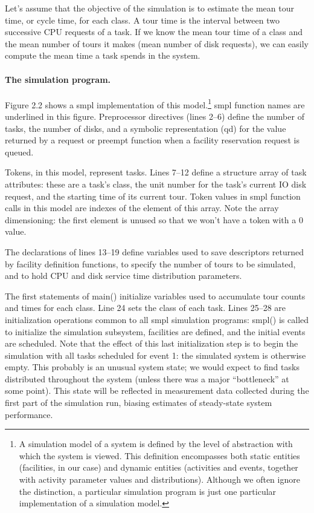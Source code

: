 Let's assume that the objective of the simulation is to estimate the mean tour
time, or cycle time, for each class. A tour time is the interval between two
successive CPU requests of a task. If we know the mean tour time of a class
and the mean number of tours it makes (mean number of disk requests), we can easily
compute the mean time a task spends in the system.

\paragraph{The simulation program.}
Figure 2.2 shows a smpl implementation of this model.\footnote{A simulation
model of a system is defined by the level of abstraction with which the system
is viewed. This definition encompasses both static entities (facilities, in our
case) and dynamic entities (activities and events, together with activity
parameter values and distributions). Although we often ignore the distinction,
a particular simulation program is just one particular implementation of a
simulation model.} smpl function names are
underlined in this figure. Preprocessor directives (lines 2--6) define the
number of tasks, the number of disks, and a symbolic representation (qd) for
the value returned by a request or preempt function when a facility
reservation request is queued.

Tokens, in this model, represent tasks. Lines 7--12 define a structure array
of task attributes: these are a task's class, the unit number for the task's
current IO disk request, and the starting time of its current tour. Token
values in smpl function calls in this model are indexes of the element of this
array. Note the array dimensioning: the first element is unused so that we
won't have a token with a 0 value.

The declarations of lines 13--19 define variables used to save descriptors
returned by facility definition functions, to specify the number of tours to be
simulated, and to hold CPU and disk service time distribution parameters.

The first statements of main() initialize variables used to accumulate tour
counts and times for each class. Line 24 sets the class of each task. Lines
25--28 are initialization operations common to all smpl simulation programs:
smpl() is called to initialize the simulation subsystem, facilities are
defined, and the initial events are scheduled. Note that the effect of this
last initialization step is to begin the simulation with all tasks scheduled
for event 1: the simulated system is otherwise empty. This probably is an
unusual system state; we would expect to find tasks distributed throughout the
system (unless there was a major ``bottleneck'' at some point). This state
will be reflected in measurement data collected during the first part of the
simulation run, biasing estimates of steady-state system performance.


